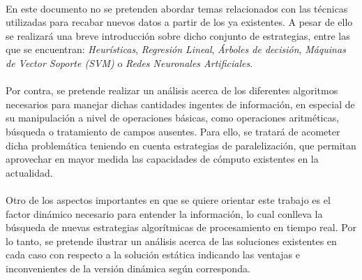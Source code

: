 \documentclass{subfiles}
\begin{document}
    \paragraph{}
    En este documento no se pretenden abordar temas relacionados con las técnicas utilizadas para recabar nuevos datos a partir de los ya existentes. A pesar de ello se realizará una breve introducción sobre dicho conjunto de estrategias, entre las que se encuentran:  \emph{Heurísticas}, \emph{Regresión Lineal}, \emph{Árboles de decisión}, \emph{Máquinas de Vector Soporte (SVM)} o \emph{Redes Neuronales Artificiales}.

    \paragraph{}
    Por contra, se pretende realizar un análisis acerca de los diferentes algoritmos necesarios para manejar dichas cantidades ingentes de información, en especial de su manipulación a nivel de operaciones básicas, como operaciones aritméticas, búsqueda o tratamiento de campos ausentes. Para ello, se tratará de acometer dicha problemática teniendo en cuenta estrategias de paralelización, que permitan aprovechar en mayor medida las capacidades de cómputo existentes en la actualidad.

    \paragraph{}
    Otro de los aspectos importantes en que se quiere orientar este trabajo es el factor dinámico necesario para entender la información, lo cual conlleva la búsqueda de nuevas estrategias algorítmicas de procesamiento en tiempo real. Por lo tanto, se pretende ilustrar un análisis acerca de las soluciones existentes en cada caso con respecto a la solución estática indicando las ventajas e inconvenientes de la versión dinámica según corresponda.
\end{document}
